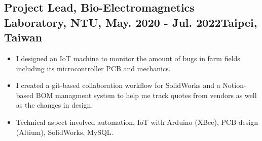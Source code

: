 \documentclass[12pt]{article}
\begin{document}
        \subsection*{Project Lead, Bio-Electromagnetics Laboratory, NTU, May. 2020 - Jul. 2022\hfill Taipei, Taiwan}
        {\sffamily \small
        \begin{itemize}
            \item I designed an IoT machine to monitor the amount of bugs in farm fields including its microcontroller PCB and mechanics.
            \item I created a git-based collaboration workflow for SolidWorks and a Notion-based BOM managment system to help me track quotes from vendors as well as the changes in design.
            \item Technical aspect involved automation, IoT with Arduino (XBee), PCB design (Altium), SolidWorks, MySQL.
        \end{itemize}
        }
        
        
\end{document}
